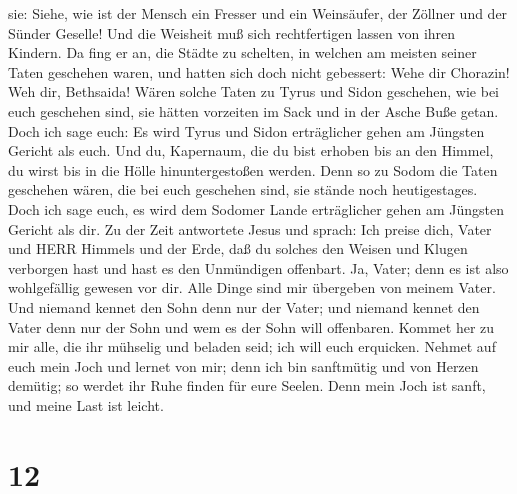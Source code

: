 sie: Siehe, wie ist der Mensch ein Fresser und ein Weinsäufer, der
Zöllner und der Sünder Geselle! Und die Weisheit muß sich rechtfertigen
lassen von ihren Kindern.  Da fing er an, die Städte zu
schelten, in welchen am meisten seiner Taten geschehen waren, und hatten
sich doch nicht gebessert:  Wehe dir Chorazin! Weh dir,
Bethsaida! Wären solche Taten zu Tyrus und Sidon geschehen, wie bei euch
geschehen sind, sie hätten vorzeiten im Sack und in der Asche Buße
getan.  Doch ich sage euch: Es wird Tyrus und Sidon
erträglicher gehen am Jüngsten Gericht als euch.  Und du,
Kapernaum, die du bist erhoben bis an den Himmel, du wirst bis in die
Hölle hinuntergestoßen werden. Denn so zu Sodom die Taten geschehen
wären, die bei euch geschehen sind, sie stände noch heutigestages.
 Doch ich sage euch, es wird dem Sodomer Lande erträglicher
gehen am Jüngsten Gericht als dir.  Zu der Zeit antwortete
Jesus und sprach: Ich preise dich, Vater und HERR Himmels und der Erde,
daß du solches den Weisen und Klugen verborgen hast und hast es den
Unmündigen offenbart.  Ja, Vater; denn es ist also
wohlgefällig gewesen vor dir.  Alle Dinge sind mir
übergeben von meinem Vater. Und niemand kennet den Sohn denn nur der
Vater; und niemand kennet den Vater denn nur der Sohn und wem es der
Sohn will offenbaren.  Kommet her zu mir alle, die ihr
mühselig und beladen seid; ich will euch erquicken.  Nehmet
auf euch mein Joch und lernet von mir; denn ich bin sanftmütig und von
Herzen demütig; so werdet ihr Ruhe finden für eure Seelen. 
Denn mein Joch ist sanft, und meine Last ist leicht.

\hypertarget{section-11}{%
\section{12}\label{section-11}}

